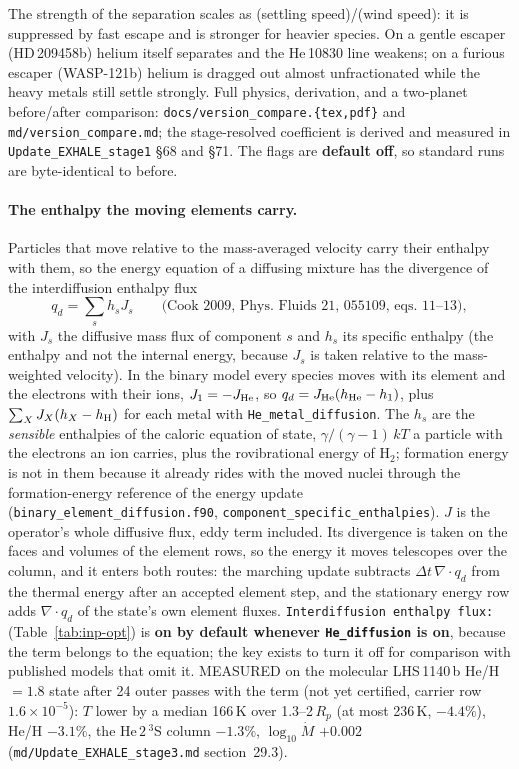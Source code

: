 \documentclass[english,a4paper]{my_memo}
\begin{document}
The strength of the separation scales as (settling speed)/(wind speed): it is
suppressed by fast escape and is stronger for heavier species. On a gentle
escaper (HD\,209458b) helium itself separates and the He\,10830 line weakens; on
a furious escaper (WASP-121b) helium is dragged out almost unfractionated while
the heavy metals still settle strongly. Full physics, derivation, and a
two-planet before/after comparison:
\texttt{docs/version\_compare.\{tex,pdf\}} and \texttt{md/version\_compare.md};
the stage-resolved coefficient is derived and measured in
\texttt{Update\_EXHALE\_stage1} \S68 and \S71. The flags are
\textbf{default off}, so standard runs are byte-identical to before.

\paragraph{The enthalpy the moving elements carry.} Particles that move
relative to the mass-averaged velocity carry their enthalpy with them, so the
energy equation of a diffusing mixture has the divergence of the
interdiffusion enthalpy flux
\[
  q_d=\sum_s h_sJ_s \qquad\text{(Cook 2009, Phys.\ Fluids 21, 055109,
  eqs.~11--13)},
\]
with $J_s$ the diffusive mass flux of component $s$ and $h_s$ its specific
enthalpy (the enthalpy and not the internal energy, because $J_s$ is taken
relative to the mass-weighted velocity). In the binary model every species
moves with its element and the electrons with their ions, $J_1=-J_{\rm He}$,
so $q_d=J_{\rm He}(h_{\rm He}-h_1)$, plus $\sum_XJ_X(h_X-h_{\rm H})$ for each
metal with \texttt{He\_metal\_diffusion}. The $h_s$ are the \emph{sensible}
enthalpies of the caloric equation of state, $\gamma/(\gamma-1)\,kT$ a
particle with the electrons an ion carries, plus the rovibrational energy of
H$_2$; formation energy is not in them because it already rides with the
moved nuclei through the formation-energy reference of the energy update
(\texttt{binary\_element\_diffusion.f90},
\texttt{component\_specific\_enthalpies}). $J$ is the operator's whole
diffusive flux, eddy term included. Its divergence is taken on the faces and
volumes of the element rows, so the energy it moves telescopes over the
column, and it enters both routes: the marching update subtracts
$\Delta t\,\nabla\!\cdot q_d$ from the thermal energy after an accepted
element step, and the stationary energy row adds $\nabla\!\cdot q_d$ of the
state's own element fluxes. \texttt{Interdiffusion enthalpy flux:}
(Table~\ref{tab:inp-opt}) is \textbf{on by default whenever
\texttt{He\_diffusion} is on}, because the term belongs to the equation; the
key exists to turn it off for comparison with published models that omit it.
MEASURED on the molecular LHS\,1140\,b He/H\,$=1.8$ state after 24 outer
passes with the term (not yet certified, carrier row $1.6\times10^{-5}$): $T$ lower by a
median 166\,K over 1.3--2\,$R_p$ (at most 236\,K, $-4.4\%$), He/H $-3.1\%$,
the He\,$2\,^3$S column $-1.3\%$, $\log_{10}\dot M$ $+0.002$
(\texttt{md/Update\_EXHALE\_stage3.md} section~29.3).
\end{document}
